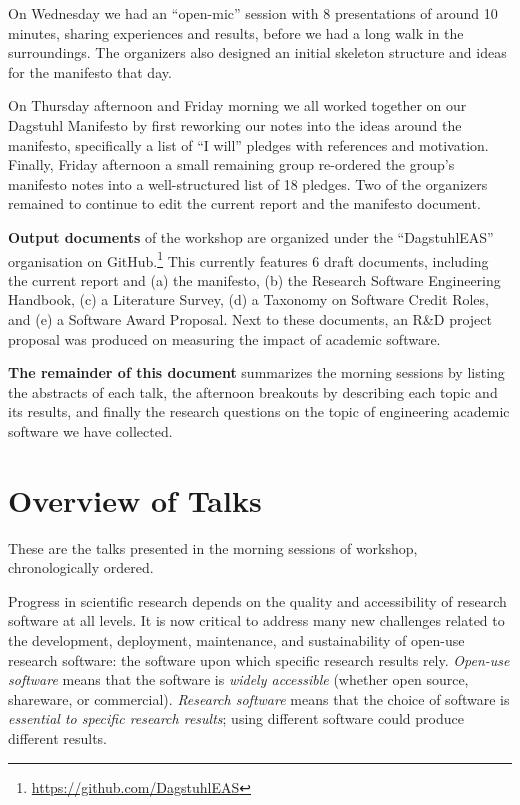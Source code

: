 \documentclass[a4paper,UKenglish]{dagrep}
\begin{document}
On Wednesday we had an ``open-mic'' session with 8 presentations of around 10 minutes, sharing experiences and results, before we had a long walk in the surroundings. The organizers also designed an initial skeleton structure and ideas for the manifesto that day.

On Thursday afternoon and Friday morning we all worked together on our Dagstuhl Manifesto by first reworking our notes into the ideas around the manifesto, specifically a list of ``I will'' pledges with references and motivation. Finally, Friday afternoon a small remaining group re-ordered the group's manifesto notes into a well-structured list of 18 pledges. Two of the organizers remained to continue to edit the current report and the manifesto document.

\textbf{Output documents} of the workshop are organized under the ``DagstuhlEAS'' organisation on GitHub.\footnote{\url{https://github.com/DagstuhlEAS}} This currently features 6 draft documents, including the current report and (a) the manifesto, (b) the Research Software Engineering Handbook, (c) a Literature Survey, (d) a Taxonomy on Software Credit Roles, and (e) a Software Award Proposal. Next to these documents, an R\&D project proposal was produced on measuring the impact of academic software.

\textbf{The remainder of this document} summarizes the morning sessions by listing the abstracts of each talk, the afternoon breakouts by describing each topic and its results, and finally the research questions on the topic of engineering academic software we have collected.

\tableofcontents

\section{Overview of Talks}

These are the talks presented in the morning sessions of workshop, chronologically ordered.



Progress in scientific research depends on the quality and accessibility of research software at all levels. It is now critical to address many new challenges related to the development, deployment, maintenance, and sustainability of open-use research software: the software upon which specific research results rely.  \emph{Open-use software} means that the software is \emph{widely accessible} (whether open source, shareware, or commercial).  \emph{Research software} means that the choice of software is \emph{essential to specific research results}; using different software could produce different results.
\end{document}
